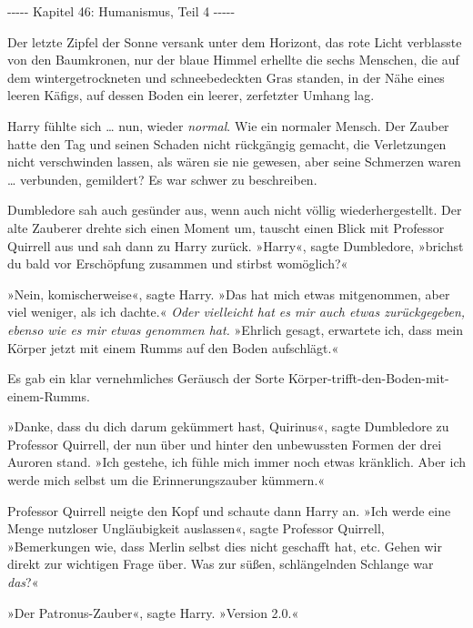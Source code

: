 

\hypertarget{humanismus-teil-4}{%

-\/-\/-\/-\/- Kapitel 46: Humanismus, Teil 4 -\/-\/-\/-\/-

Der letzte Zipfel der Sonne versank unter dem Horizont, das rote Licht verblasste von den Baumkronen, nur der blaue Himmel erhellte die sechs Menschen, die auf dem wintergetrockneten und schneebedeckten Gras standen, in der Nähe eines leeren Käfigs, auf dessen Boden ein leerer, zerfetzter Umhang lag.

Harry fühlte sich … nun, wieder \emph{normal}. Wie ein normaler Mensch. Der Zauber hatte den Tag und seinen Schaden nicht rückgängig gemacht, die Verletzungen nicht verschwinden lassen, als wären sie nie gewesen, aber seine Schmerzen waren … verbunden, gemildert? Es war schwer zu beschreiben.

Dumbledore sah auch gesünder aus, wenn auch nicht völlig wiederhergestellt. Der alte Zauberer drehte sich einen Moment um, tauscht einen Blick mit Professor Quirrell aus und sah dann zu Harry zurück. »Harry«, sagte Dumbledore, »brichst du bald vor Erschöpfung zusammen und stirbst womöglich?«

»Nein, komischerweise«, sagte Harry. »Das hat mich etwas mitgenommen, aber viel weniger, als ich dachte.« \emph{Oder vielleicht hat es mir auch etwas zurückgegeben, ebenso wie es mir etwas genommen hat.} »Ehrlich gesagt, erwartete ich, dass mein Körper jetzt mit einem Rumms auf den Boden aufschlägt.«

Es gab ein klar vernehmliches Geräusch der Sorte Körper-trifft-den-Boden-mit-einem-Rumms.

»Danke, dass du dich darum gekümmert hast, Quirinus«, sagte Dumbledore zu Professor Quirrell, der nun über und hinter den unbewussten Formen der drei Auroren stand. »Ich gestehe, ich fühle mich immer noch etwas kränklich. Aber ich werde mich selbst um die Erinnerungszauber kümmern.«

Professor Quirrell neigte den Kopf und schaute dann Harry an. »Ich werde eine Menge nutzloser Ungläubigkeit auslassen«, sagte Professor Quirrell, »Bemerkungen wie, dass Merlin selbst dies nicht geschafft hat, etc. Gehen wir direkt zur wichtigen Frage über. Was zur süßen, schlängelnden Schlange war \emph{das}?«

»Der Patronus-Zauber«, sagte Harry. »Version 2.0.«

}
